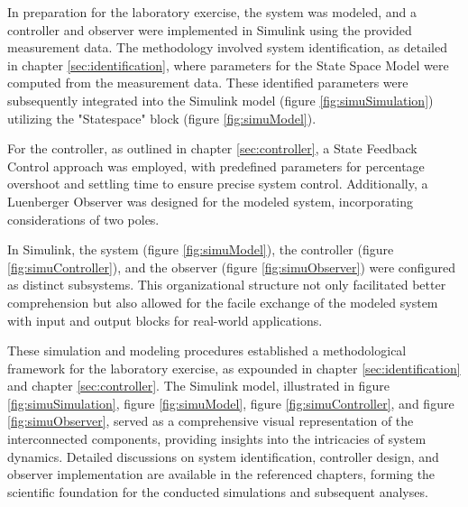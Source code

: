 In preparation for the laboratory exercise, the system was modeled, and a controller and observer were implemented in Simulink using the provided measurement data. The methodology involved system identification, as detailed in chapter \ref{sec:identification}, where parameters for the State Space Model were computed from the measurement data. These identified parameters were subsequently integrated into the Simulink model (figure \ref{fig:simuSimulation}) utilizing the "Statespace" block (figure \ref{fig:simuModel}).

For the controller, as outlined in chapter \ref{sec:controller}, a State Feedback Control approach was employed, with predefined parameters for percentage overshoot and settling time to ensure precise system control. Additionally, a Luenberger Observer was designed for the modeled system, incorporating considerations of two poles.

In Simulink, the system (figure \ref{fig:simuModel}), the controller (figure \ref{fig:simuController}), and the observer (figure \ref{fig:simuObserver}) were configured as distinct subsystems. This organizational structure not only facilitated better comprehension but also allowed for the facile exchange of the modeled system with input and output blocks for real-world applications.

These simulation and modeling procedures established a methodological framework for the laboratory exercise, as expounded in chapter \ref{sec:identification} and chapter \ref{sec:controller}. The Simulink model, illustrated in figure \ref{fig:simuSimulation}, figure \ref{fig:simuModel}, figure \ref{fig:simuController}, and figure \ref{fig:simuObserver}, served as a comprehensive visual representation of the interconnected components, providing insights into the intricacies of system dynamics. Detailed discussions on system identification, controller design, and observer implementation are available in the referenced chapters, forming the scientific foundation for the conducted simulations and subsequent analyses.